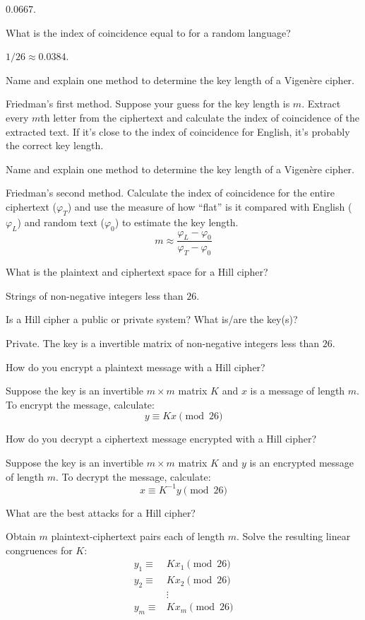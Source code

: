 \documentclass{article}
\newcounter{qcounter}
\newcommand{\showqcounter}{\theqcounter}
\newcommand{\question}{\vspace{5mm}\addtocounter{qcounter}{1}\vspace{5mm}{\bf Q\showqcounter: }}
\newcommand{\answer}{\vspace{5mm}{\bf A\showqcounter: }}
\begin{document}
\answer $0.0667$.


\question What is the index of coincidence equal to for a random language?

\answer $1 / 26 \approx 0.0384$.


\question Name and explain one method to determine the key length of a Vigen\`ere cipher.

\answer Friedman's first method. Suppose your guess for the key length is $m$. Extract every $m$th letter from the ciphertext 
  and calculate the index of coincidence of the extracted text. 
  If it's close to the index of coincidence for English, it's probably the correct key length.


\question Name and explain one method to determine the key length of a Vigen\`ere cipher.

\answer Friedman's second method. Calculate the index of coincidence for the entire ciphertext ($\varphi_T$) and use the measure 
  of how ``flat'' is it compared with English ($\varphi_L$) and random text ($\varphi_0$) to estimate the key length.
  $$
    m \approx \frac{\varphi_L - \varphi_0}{\varphi_T - \varphi_0}
  $$


\question What is the plaintext and ciphertext space for a Hill cipher?

\answer Strings of non-negative integers less than $26$.


\question Is a Hill cipher a public or private system? What is/are the key(s)?

\answer Private. The key is a invertible matrix of non-negative integers less than $26$.


\question How do you encrypt a plaintext message with a Hill cipher?

\answer Suppose the key is an invertible $m \times m$ matrix $K$ and $x$ is a message of length $m$. 
  To encrypt the message, calculate:
  $$
    y \equiv K x \pmod{26}
  $$


\question How do you decrypt a ciphertext message encrypted with a Hill cipher?

\answer Suppose the key is an invertible $m \times m$ matrix $K$ and $y$ is an encrypted message of length $m$. 
To decrypt the message, calculate:
$$
  x \equiv K^{-1} y \pmod{26}
$$


\question What are the best attacks for a Hill cipher?

\answer Obtain $m$ plaintext-ciphertext pairs each of length $m$.
  Solve the resulting linear congruences for $K$:
  \begin{align*}
    y_1 \equiv& K x_1 \pmod{26}\\
    y_2 \equiv& K x_2 \pmod{26}\\
              & \vdots\\
    y_m \equiv& K x_m \pmod{26}
  \end{align*}

\question 

\answer 


\question 

\answer 


\question 

\answer 


\question 

\answer 
\end{document}
